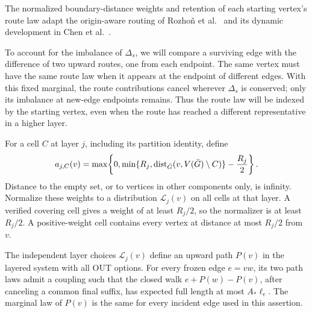 The normalized boundary-distance weights and retention of each starting
vertex's route law adapt the origin-aware routing of Rozho\v{n} et al.\
\cite[Section~4]{MinorAggregateRouting} and its dynamic development in
Chen et al.\ \cite[Section~4.3]{IncrementalGraphs}.

To account for the imbalance of $\Delta_s$, we will compare a surviving
edge with the difference of two upward routes, one from each endpoint.
The same vertex must have the same route law when it appears at the
endpoint of different edges.  With this fixed marginal, the route
contributions cancel wherever $\Delta_s$ is conserved; only its imbalance
at new-edge endpoints remains.  Thus the route law will be indexed by
the starting vertex, even when the route has reached a different
representative in a higher layer.

For a cell $C$ at layer $j$, including its partition identity, define
\begin{equation}
\label{back:cell-weight}
 a_{j,C}(v)=
 \max\!\left\{0,
   \min\{R_j,\operatorname{dist}_{\bar G}(v,V(\bar G)\setminus C)\}
                       -\frac{R_j}{2}\right\}.
\end{equation}
Distance to the empty set, or to vertices in other components only,
is infinity.  Normalize these weights to a distribution
$\mathcal L_j(v)$ on all cells at that layer.  A verified covering
cell gives a weight of at least $R_j/2$, so the normalizer is at least
$R_j/2$.  A positive-weight cell contains every vertex at distance at
most $R_j/2$ from $v$.

\begin{lemma}
\label{back:path-law}
The independent layer choices $\mathcal L_j(v)$ define an upward path
$P(v)$ in the layered system with all OUT options.  For every frozen
edge $e=vw$, its two path laws admit a coupling such that the closed
walk $e+P(w)-P(v)$, after canceling a common final suffix, has expected
full length at most $A_*\ell_e$.  The marginal law of $P(v)$ is the
same for every incident edge used in this assertion.
\end{lemma}

